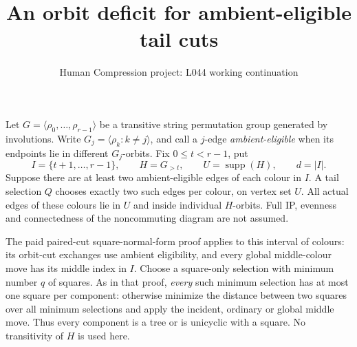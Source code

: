 \documentclass[11pt,a4paper]{article}
\title{An orbit deficit for ambient-eligible tail cuts}
\author{Human Compression project: L044 working continuation}
\date{}
\newcommand{\gen}[1]{\langle#1\rangle}
\begin{document}
\maketitle
Let $G=\gen{\rho_0,\ldots,\rho_{r-1}}$ be a transitive
string permutation group generated by involutions. Write
$G_j=\gen{\rho_k:k\ne j}$, and call a $j$-edge
\emph{ambient-eligible} when its endpoints lie in different
$G_j$-orbits. Fix $0\leq t<r-1$, put
\[
 I=\{t+1,\ldots,r-1\},\qquad H=G_{>t},\qquad
 U=\operatorname{supp}(H),\qquad d=|I|.
\]
Suppose there are at least two ambient-eligible edges of
each colour in $I$. A tail selection $Q$ chooses exactly
two such edges per colour, on vertex set $U$.
All actual edges of these colours lie in $U$ and inside
individual $H$-orbits. Full IP, evenness and connectedness
of the noncommuting diagram are not assumed.

The paid paired-cut square-normal-form proof applies to this
interval of colours: its orbit-cut exchanges use ambient
eligibility, and every global middle-colour move has its
middle index in $I$. Choose a square-only selection with
minimum number $q$ of squares. As in that proof, \emph{every}
such minimum selection has at most one square per component:
otherwise minimize the distance between two squares over all
minimum selections and apply the incident, ordinary or global
middle move. Thus every component is a tree or is unicyclic
with a square. No transitivity of $H$ is used here.
\end{document}
